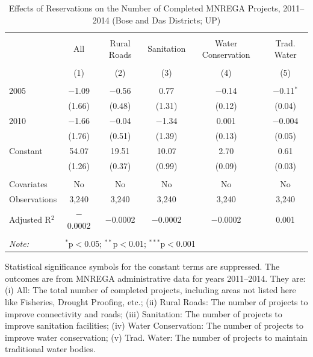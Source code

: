 \begin{table}[!htbp]
\centering
\begin{threeparttable}

  \caption{Effects of Reservations on the Number of Completed MNREGA Projects, 2011--2014 (Bose and Das Districts; UP)} 
  \label{mnrega_up_bd_districts_05_10} 
\scriptsize 
\begin{tabular}{@{\extracolsep{0pt}}lccccc} 
\\[-1.8ex]\hline 
\hline \\[-1.8ex] 
 & All & Rural Roads & Sanitation & Water Conservation & Trad. Water \\ 
\\[-1.8ex] & (1) & (2) & (3) & (4) & (5)\\ 
\hline \\[-1.8ex] 
 2005 & $-$1.09 & $-$0.56 & 0.77 & $-$0.14 & $-$0.11$^{*}$ \\ 
  & (1.66) & (0.48) & (1.31) & (0.12) & (0.04) \\ 
  2010 & $-$1.66 & $-$0.04 & $-$1.34 & 0.001 & $-$0.004 \\ 
  & (1.76) & (0.51) & (1.39) & (0.13) & (0.05) \\ 
  Constant & 54.07 & 19.51 & 10.07 & 2.70 & 0.61 \\ 
  & (1.26) & (0.37) & (0.99) & (0.09) & (0.03) \\ 
 \hline \\[-1.8ex] 
Covariates & No & No & No & No & No \\ 
Observations & 3,240 & 3,240 & 3,240 & 3,240 & 3,240 \\ 
Adjusted R$^{2}$ & $-$0.0002 & $-$0.0002 & $-$0.0002 & $-$0.0002 & 0.001 \\ 
\hline 
\hline \\[-1.8ex] 
\textit{Note:}  & \multicolumn{5}{l}{$^{*}$p$<$0.05; $^{**}$p$<$0.01; $^{***}$p$<$0.001} \\ 
\end{tabular} 
\begin{tablenotes}[flushleft]
\scriptsize
\item[] Statistical significance symbols for the constant terms are suppressed. The outcomes are from MNREGA administrative data for years 2011--2014. They are:
(i) All: The total number of completed projects, including areas not listed here
like Fisheries, Drought Proofing, etc.;
(ii) Rural Roads: The number of projects to improve connectivity and roads;
(iii) Sanitation: The number of projects to improve sanitation facilities;
(iv) Water Conservation: The number of projects to improve water conservation;
(v) Trad. Water: The number of projects to maintain traditional water bodies.
\end{tablenotes}
\end{threeparttable}
\end{table}
